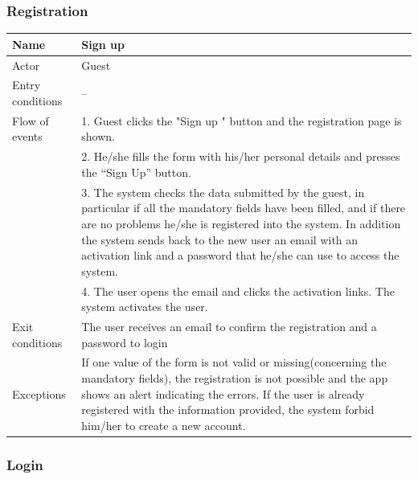 \subsubsection{Registration}

\begin{table}[!h]
\begin{tabularx}{\linewidth}{l|X}
\centering
Name & Sign up \\ \hline
Actor & Guest \\ \hline
Entry conditions & -- \\ \hline
Flow of events & 1. Guest clicks the "Sign up " button and the registration page is shown. \\
& 2. He/she fills the form with his/her personal details and presses the “Sign Up” button.\\
& 3. The system checks the data submitted by the guest, in particular if all the mandatory fields have been filled, and if there are no problems he/she is registered into the system. In addition the system sends back to the new user an email with an activation link and a password that he/she can use to access the system.\\
& 4. The user opens the email and clicks the activation links. The system activates the user. \\ \hline
Exit conditions & The user receives an email to confirm the registration and a password to login \\ \hline
Exceptions & If one value of the form is not valid or missing(concerning the mandatory fields), the registration is not possible and the app shows an alert indicating the errors. If the user is already registered with the information provided, the system forbid him/her to create a new account. \\
\end{tabularx}
\end{table}

\clearpage

\subsubsection{Login}

